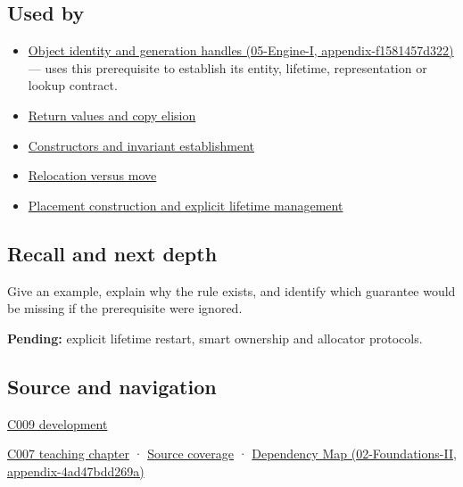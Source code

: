 \subsection{Used by}\label{used-by}

\begin{itemize}
\tightlist
\item
  \href{}{Object identity and generation handles (05-Engine-I, appendix-f1581457d322)} --- uses this prerequisite to establish its entity, lifetime, representation or lookup contract.
\item
  \hyperref[appendix-b08d3788c5c6]{Return values and copy elision}
\item
  \hyperref[appendix-7f8ec83d0886]{Constructors and invariant establishment}
\item
  \hyperref[appendix-adfd6397af8d]{Relocation versus move}
\item
  \hyperref[appendix-f56c3e43fd4e]{Placement construction and explicit lifetime management}
\end{itemize}

\subsection{Recall and next depth}\label{recall-and-next-depth}

Give an example, explain why the rule exists, and identify which guarantee would be missing if the prerequisite were ignored.

\textbf{Pending:} explicit lifetime restart, smart ownership and allocator protocols.

\subsection{Source and navigation}\label{source-and-navigation}

\hyperref[appendix-fd090d982a15]{C009 development}

\href{Continuous\%20Notes/Computing\%20Foundations\%20-\%20From\%20Bits\%20to\%20C++\%20and\%20Systems\%20APIs\#Storage\%20is\%20a\%20place;\%20an\%20object\%20is\%20its\%20occupant}{C007 teaching chapter} · \hyperref[appendix-fd090d982a15]{Source coverage} · \href{}{Dependency Map (02-Foundations-II, appendix-4ad47bdd269a)}
